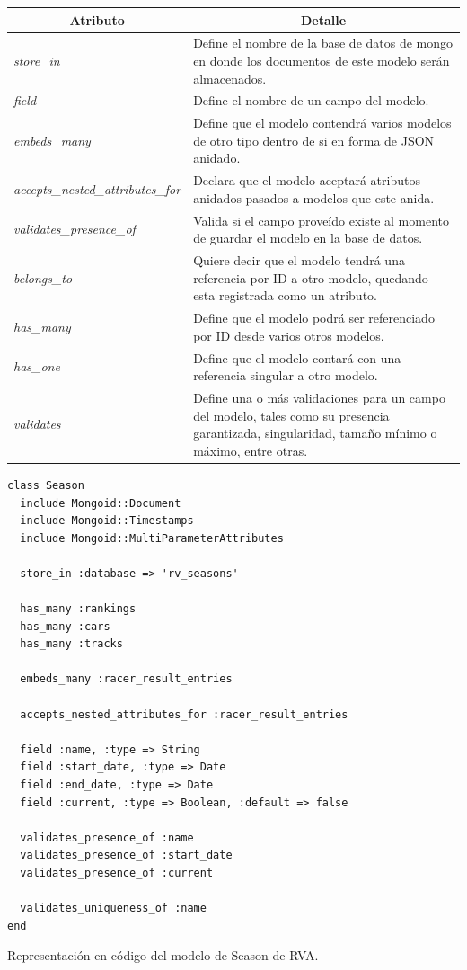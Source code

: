 \begin{center}
  \begin{tabular}{ | p{6cm} | p{11cm} |}
    \hline
    \multicolumn{1}{|c|}{\textbf{Atributo}} & \multicolumn{1}{|c|}{\textbf{Detalle}} \\
    \hline
    
    {\textit{store\_in}} & Define el nombre de la base de datos de mongo en donde los documentos de este modelo serán almacenados.\\ \hline
    {\textit{field}} & Define el nombre de un campo del modelo. \\ \hline
    {\textit{embeds\_many}} & Define que el modelo contendrá varios modelos de otro tipo dentro de si en forma de JSON anidado. \\ \hline
    {\textit{accepts\_nested\_attributes\_for}} & Declara que el modelo aceptará atributos anidados pasados a modelos que este anida. \\ \hline
    {\textit{validates\_presence\_of}} & Valida si el campo proveído existe al momento de guardar el modelo en la base de datos. \\ \hline
    {\textit{belongs\_to}} & Quiere decir que el modelo tendrá una referencia por ID a otro modelo, quedando esta registrada como un atributo.
     \\ \hline
    {\textit{has\_many}} & Define que el modelo podrá ser referenciado por ID desde varios otros modelos. \\ \hline
    {\textit{has\_one}} & Define que el modelo contará con una referencia singular a otro modelo. \\ \hline
    {\textit{validates}} & Define una o más validaciones para un campo del modelo, tales como su presencia garantizada, singularidad, tamaño mínimo o máximo, entre otras.\\ \hline
  \end{tabular}
\end{center}

\begin{listing}
  \begin{verbatim}
class Season
  include Mongoid::Document
  include Mongoid::Timestamps
  include Mongoid::MultiParameterAttributes
  
  store_in :database => 'rv_seasons'
  
  has_many :rankings
  has_many :cars
  has_many :tracks
  
  embeds_many :racer_result_entries
  
  accepts_nested_attributes_for :racer_result_entries
  
  field :name, :type => String
  field :start_date, :type => Date
  field :end_date, :type => Date
  field :current, :type => Boolean, :default => false
  
  validates_presence_of :name
  validates_presence_of :start_date
  validates_presence_of :current
  
  validates_uniqueness_of :name
end
  \end{verbatim}
  \caption[Esquema de Season]{Representación en código del modelo de Season de RVA.}
\end{listing}


